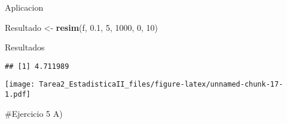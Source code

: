 \documentclass[
]{article}
\newenvironment{Shaded}{\begin{snugshade}}{\end{snugshade}}
\newcommand{\AttributeTok}[1]{\textcolor[rgb]{0.13,0.29,0.53}{#1}}
\newcommand{\CommentTok}[1]{\textcolor[rgb]{0.56,0.35,0.01}{\textit{#1}}}
\newcommand{\DecValTok}[1]{\textcolor[rgb]{0.00,0.00,0.81}{#1}}
\newcommand{\FloatTok}[1]{\textcolor[rgb]{0.00,0.00,0.81}{#1}}
\newcommand{\FunctionTok}[1]{\textcolor[rgb]{0.13,0.29,0.53}{\textbf{#1}}}
\newcommand{\NormalTok}[1]{#1}
\newcommand{\OtherTok}[1]{\textcolor[rgb]{0.56,0.35,0.01}{#1}}
\newcommand{\SpecialCharTok}[1]{\textcolor[rgb]{0.81,0.36,0.00}{\textbf{#1}}}
\newcommand{\StringTok}[1]{\textcolor[rgb]{0.31,0.60,0.02}{#1}}
\begin{document}
Aplicacion

\begin{Shaded}
\begin{Highlighting}[]
\NormalTok{Resultado }\OtherTok{\textless{}{-}} \FunctionTok{resim}\NormalTok{(f, }\FloatTok{0.1}\NormalTok{, }\DecValTok{5}\NormalTok{, }\DecValTok{1000}\NormalTok{, }\DecValTok{0}\NormalTok{, }\DecValTok{10}\NormalTok{)}
\end{Highlighting}
\end{Shaded}

Resultados

\begin{Shaded}
\end{Shaded}

\begin{verbatim}
## [1] 4.711989
\end{verbatim}

\begin{Shaded}
\end{Shaded}

\texttt{[image: Tarea2\_EstadisticaII\_files/figure-latex/unnamed-chunk-17-1.pdf]}

\#Ejercicio 5 A)
\end{document}
